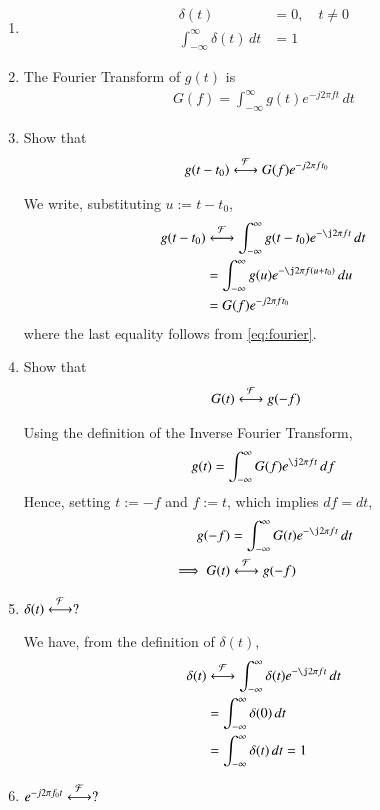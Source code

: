 \documentclass[journal,12pt,twocolumn]{IEEEtran}
\renewcommand\thesection{\arabic{section}}
\begin{document}
\begin{enumerate}[label=\thesection.\arabic*
,ref=\thesection.\theenumi]
\item 
\begin{align}
	\delta(t)&=0, \quad t\neq 0 \\
	\int_{-\infty}^{\infty}\delta(t) \, dt&= 1
\end{align}
\item The Fourier Transform of $g(t)$ is
\begin{align}
G(f)=\int_{-\infty}^{\infty}g(t)e^{-j2\pi ft}\,dt
\label{eq:fourier}
\end{align}
\item Show that 
\begin{align}
    g(t-t_0)&\overset{\mathcal{F}}{ \longleftrightarrow}G(f)e^{-j2\pi ft_0}
    \label{eq:t-shift}
\end{align}

\solution We write, substituting $u := t-t_0$,
\begin{align}
    g(t-t_0)&\system{F}\int_{-\infty}^{\infty}
            g(t-t_0)e^{-\j2\pi ft}\,dt \\
            &=\int_{-\infty}^{\infty}
            g(u)e^{-\j2\pi f(u + t_0)}\,du \\
            &=G(f)e^{-j2\pi ft_0}
\end{align}
where the last equality follows from \eqref{eq:fourier}.
\item Show that
\begin{align}
    G(t)&\overset{\mathcal{F}}{ \longleftrightarrow}g(-f)
\end{align}

\solution Using the definition of the Inverse Fourier Transform,
\begin{align}
    g(t)=\int_{-\infty}^{\infty}G(f)e^{\j2\pi ft}\,df
    \label{eq:duality}
\end{align}
Hence, setting $t := -f$ and $f := t$, which implies $df = dt$,
\begin{align}
    g(-f)&=\int_{-\infty}^{\infty}G(t)e^{-\j2\pi ft}\,dt \\
    \implies G(t)&\system{F}g(-f)
\end{align}
\item $\delta(t)\overset{\mathcal{F}}{ \longleftrightarrow}?$

\solution We have, from the definition of $\delta(t)$,
\begin{align}
    \delta(t)&\system{F}\int_{-\infty}^{\infty}\delta(t)e^{-\j2\pi ft}\, dt \\
             &=\int_{-\infty}^{\infty}\delta(0)\, dt \\
             &=\int_{-\infty}^{\infty}\delta(t)\, dt = 1
             \label{eq:fourier-delta}
\end{align}
\item $e^{-j2\pi f_0t}\overset{\mathcal{F}}{ \longleftrightarrow}?$


\end{enumerate}
\end{document}
